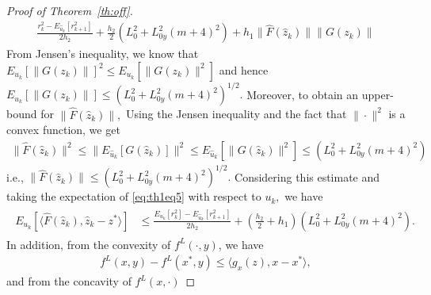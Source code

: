 \documentclass{article}
\theoremstyle{plain}
\theoremstyle{definition}
\theoremstyle{remark}
\begin{document}
\begin{proof}[Proof of Theorem~\ref{th:off}]
\begin{align}
    \frac{r_k^2-E_{\hat{u}_k}[r_{k+1}^2]}{2h_2}+\frac{h_2}{2}( L_0^2  +  L_{0y}^2(m+4)^2)+h_1\|\hat{F}(\hat{z}_k)\| \|G(z_k)\|
\end{align}
From
Jensen's inequality, we know that 
$E_{u_k}[\|G(z_k)\|]^2\leq E_{u_k}[\|G(z_k)\|^2]$ and hence %
$E_{u_k}[\|G(z_k)\|] \leq ( L_0^2+L_{0y}^2(m+4)^2)^{1/2}.$ Moreover, to obtain an upper-bound for $\|\hat{F}(\hat{z}_k)\|,$ 
Using the Jensen inequality and the fact that $\|\cdot\|^2$ is a convex function, we get 
\begin{align*}
    \|\hat{F}(\hat{z}_k)\|^2\leq\|E_{\hat{u}_k}[G(\hat{z}_k)]\|^2\leq E_{\hat{u}_k}[\|G(\hat{z}_k)\|^2]\leq( L_0^2+L_{0y}^2(m+4)^2)
\end{align*}
i.e., $\|\hat{F}(\hat{z}_k)\|\leq(L_0^2+L_{0y}^2(m+4)^2)^{1/2}.$ Considering this estimate
and taking the expectation of \eqref{eq:th1eq5} with respect to $u_k,$ we have
\begin{align}
\begin{split}
    E_{u_k}[\langle \hat{F}(\hat{z}_k),\hat{z}_k-z^\ast\rangle]&\leq  \frac{E_{u_k}[r_k^2]-E_{\hat{u}_k}[r_{k+1}^2]}{2h_2}+(\tfrac{h_2}{2}+h_1)( L_0^2 + L_{0y}^2(m+4)^2).
    \end{split}\label{eq:th1eq6}
    \end{align}
    In addition, from the convexity of $f^L(\cdot,y)$, %
    we have 
    \begin{align}\label{eq:th1eq7}
        f^L(x,y)-f^L(x^\ast,y)\leq \langle g_x(z),x-x^\ast\rangle,
    \end{align}
    and from the concavity of $f^L(x,\cdot)$

\end{proof}
\end{document}
